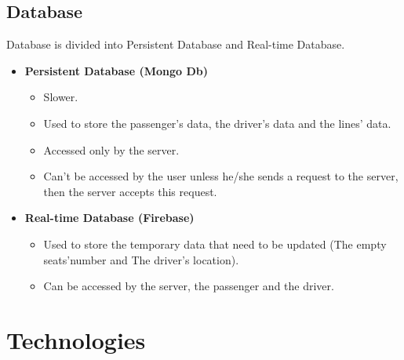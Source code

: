 \subsection{Database}
\hspace{2cm} Database is divided into Persistent Database and Real-time Database.
\begin{itemize}
    \item {\textbf{Persistent Database (Mongo Db)}} 
    \begin{itemize}
        \item Slower.
        \item Used to store the passenger's data, the driver's data and the lines' data.
        \item Accessed only by the server.
        \item Can't be accessed by the user unless he/she sends a request to the server, then the server accepts this request.
    \end{itemize}
    \item {\textbf{Real-time Database (Firebase)}} 
    \begin{itemize}
        \item Used to store the temporary data that need to be updated (The empty seats'number and The driver's location).
        \item Can be accessed by the server, the passenger and the driver.
    \end{itemize}
\end{itemize}
\section{Technologies}
